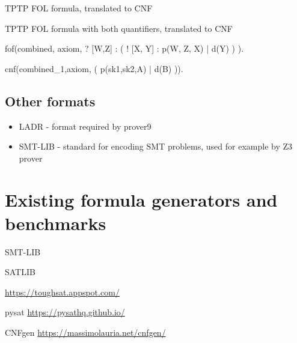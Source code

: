 \begin{listing}[H]
  \caption{TPTP FOL formula, translated to CNF}
\end{listing}

\begin{listing}[H]
  \caption{TPTP FOL formula with both quantifiers, translated to CNF}
\begin{tptpcode}
fof(combined, axiom,
 ? [W,Z] : ( ! [X, Y] : p(W, Z, X)  | d(Y) )
  ).

cnf(combined_1,axiom,
    ( p(sk1,sk2,A) | d(B) )).
\end{tptpcode}
\end{listing}

\subsection{Other formats}

\begin{itemize}
  \item \gls{LADR} - format required by prover9
  \item SMT-LIB - standard for encoding SMT problems, used for example by Z3 prover
\end{itemize}


\section{Existing formula generators and benchmarks}

SMT-LIB \cite{BarFT-RR-17}

SATLIB \cite{Hol00}

\url{https://toughsat.appspot.com/}

pysat \url{https://pysathq.github.io/}

CNFgen \url{https://massimolauria.net/cnfgen/}
